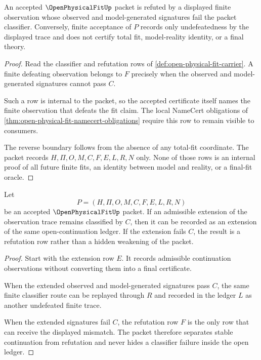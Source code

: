 \begin{theorem}
\label{thm:open-physical-fit-refutation-boundary}
An accepted $\OpenPhysicalFitUp$ packet is refuted by a displayed finite observation whose observed and model-generated signatures fail the packet classifier. Conversely, finite acceptance of $P$ records only undefeatedness by the displayed trace and does not certify total fit, model-reality identity, or a final theory.
\end{theorem}
\begin{proof}
Read the classifier and refutation rows of \autoref{def:open-physical-fit-carrier}. A finite defeating observation belongs to $F$ precisely when the observed and model-generated signatures cannot pass $C$.

Such a row is internal to the packet, so the accepted certificate itself names the finite observation that defeats the fit claim. The local NameCert obligations of \autoref{thm:open-physical-fit-namecert-obligations} require this row to remain visible to consumers.

The reverse boundary follows from the absence of any total-fit coordinate. The packet records $H,\Pi,O,M,C,F,E,L,R,N$ only. None of those rows is an internal proof of all future finite fits, an identity between model and reality, or a final-fit oracle.
\end{proof}

\begin{theorem}
\label{thm:open-physical-fit-observation-extension-stability}
Let
$$
P=(H,\Pi,O,M,C,F,E,L,R,N)
$$
be an accepted $\OpenPhysicalFitUp$ packet. If an admissible extension of the observation trace remains classified by $C$, then it can be recorded as an extension of the same open-continuation ledger. If the extension fails $C$, the result is a refutation row rather than a hidden weakening of the packet.
\end{theorem}
\begin{proof}
Start with the extension row $E$. It records admissible continuation observations without converting them into a final certificate.

When the extended observed and model-generated signatures pass $C$, the same finite classifier route can be replayed through $R$ and recorded in the ledger $L$ as another undefeated finite trace.

When the extended signatures fail $C$, the refutation row $F$ is the only row that can receive the displayed mismatch. The packet therefore separates stable continuation from refutation and never hides a classifier failure inside the open ledger.
\end{proof}

